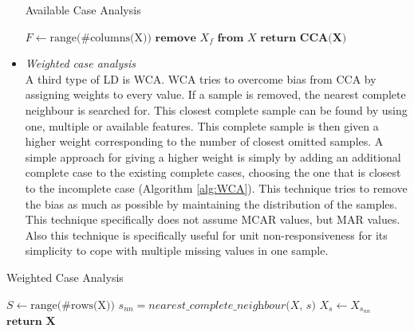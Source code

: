 \documentclass[10pt,a4paper]{article}
\begin{document}
\begin{itemize}
	\begin{algorithm}[H]
		\caption{Available Case Analysis}\label{alg:ACA}
		\begin{algorithmic}[1]
			\State $F \gets \text{range(\#columns(X))}$ 	
			 					
			 				 			
			\State $\textbf{remove } X_f \textbf{ from } X$ 				
			\EndIf
			\EndFor
			\State $\textbf{return CCA(X)}$
			\EndProcedure
		\end{algorithmic}
	\end{algorithm}	
	
	\item \textit{Weighted case analysis} \\
	A third type of LD is WCA. WCA tries to overcome bias from CCA by assigning weights to every value. If a sample is removed, the nearest complete neighbour is searched for. This closest complete sample can be found by using one, multiple or available features. This complete sample is then given a higher weight corresponding to the number of closest omitted samples. A simple approach for giving a higher weight is simply by adding an additional complete case to the existing complete cases, choosing the one that is closest to the incomplete case (Algorithm \ref{alg:WCA}). This technique tries to remove the bias as much as possible by maintaining the distribution of the samples. This technique specifically does not assume MCAR values, but MAR values\cite{haukoos2007advanced, donders2006gentle}. Also this technique is specifically useful for unit non-responsiveness for its simplicity to cope with multiple missing values in one sample\cite{patrician2002multiple}.
	\end{itemize}
	
	\begin{algorithm}[H]
		\caption{Weighted Case Analysis}\label{alg:WCA}
		\begin{algorithmic}[1]
			\State $S \gets \text{range(\#rows(X))}$ 	
			 					
			 				 			
			\State $s_{nn} = \textit{nearest\_complete\_neighbour(X, s)}$	
			\State $ X_s \gets X_{s_{nn}}$ 				
			\EndIf
			\EndFor
			\State $\textbf{return X}$
			\EndProcedure
		\end{algorithmic}
	\end{algorithm}	
	
\end{document}
